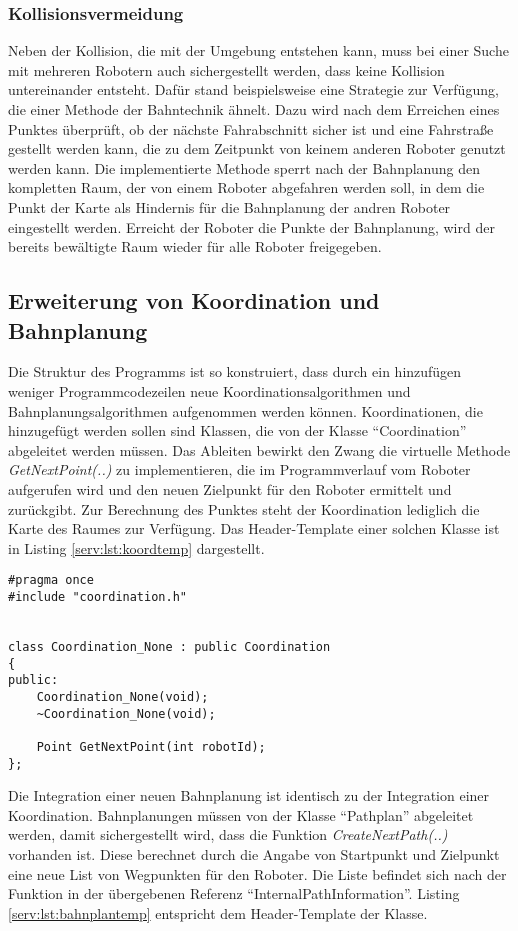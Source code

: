 \subsubsection{Kollisionsvermeidung}
Neben der Kollision, die mit der Umgebung entstehen kann, muss bei einer Suche mit mehreren Robotern auch sichergestellt werden, dass keine Kollision untereinander entsteht. Dafür stand beispielsweise eine Strategie zur Verfügung, die einer Methode der Bahntechnik ähnelt. Dazu wird nach dem Erreichen eines Punktes überprüft, ob der nächste Fahrabschnitt sicher ist und eine Fahrstraße gestellt werden kann, die zu dem Zeitpunkt von keinem anderen Roboter genutzt werden kann. Die implementierte Methode sperrt nach der Bahnplanung den kompletten Raum, der von einem Roboter abgefahren werden soll, in dem die Punkt der Karte als Hindernis für die Bahnplanung der andren Roboter eingestellt werden. Erreicht der Roboter die Punkte der Bahnplanung, wird der bereits bewältigte Raum wieder für alle Roboter freigegeben.

\subsection{Erweiterung von Koordination und Bahnplanung}

Die Struktur des Programms ist so konstruiert, dass durch ein hinzufügen weniger Programmcodezeilen neue Koordinationsalgorithmen und Bahnplanungsalgorithmen aufgenommen werden können. Koordinationen, die hinzugefügt werden sollen sind Klassen, die von der Klasse "`Coordination"' abgeleitet werden müssen. Das Ableiten bewirkt den Zwang die virtuelle Methode {\it GetNextPoint(..)} zu implementieren, die im Programmverlauf vom Roboter aufgerufen wird und den neuen Zielpunkt für den Roboter ermittelt und zurückgibt. Zur Berechnung des Punktes steht der Koordination lediglich die Karte des Raumes zur Verfügung. Das Header-Template einer solchen Klasse ist in Listing \ref{serv:lst:koordtemp} dargestellt.

\begin{lstlisting}[frame=tb,captionpos=b,caption=Koordinationstemplate., label=serv:lst:koordtemp]
#pragma once
#include "coordination.h"


class Coordination_None : public Coordination
{
public:
    Coordination_None(void);
    ~Coordination_None(void);

    Point GetNextPoint(int robotId);
};
\end{lstlisting}

Die Integration einer neuen Bahnplanung ist identisch zu der Integration einer Koordination. Bahnplanungen müssen von der Klasse "`Pathplan"' abgeleitet werden, damit sichergestellt wird, dass die Funktion {\it CreateNextPath(..)} vorhanden ist. Diese berechnet durch die Angabe von Startpunkt und Zielpunkt eine neue List von Wegpunkten für den Roboter. Die Liste befindet sich nach der Funktion in der übergebenen Referenz "`InternalPathInformation"'. Listing \ref{serv:lst:bahnplantemp} entspricht dem Header-Template der Klasse.

